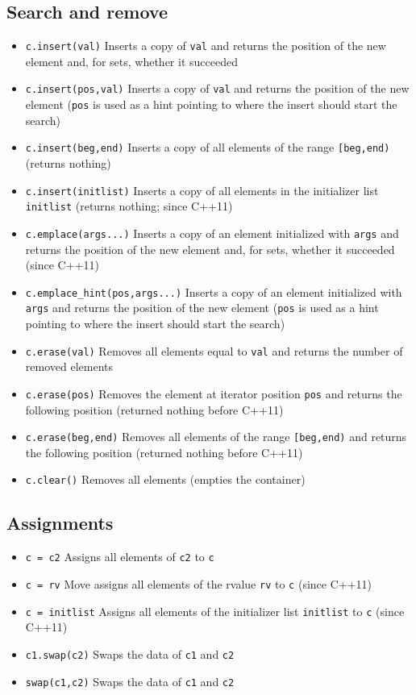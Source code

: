 \documentclass{report}
\begin{document}
\subsection{Search and remove}
\begin{itemize}
    \item \texttt{c.insert(val)} Inserts a copy of \texttt{val} and returns the position of the new element and, for sets, whether it succeeded
    \item \texttt{c.insert(pos,val)} Inserts a copy of \texttt{val} and returns the position of the new element (\texttt{pos} is used as a hint pointing to where the insert should start the search)
    \item \texttt{c.insert(beg,end)} Inserts a copy of all elements of the range \texttt{[beg,end)} (returns nothing)
    \item \texttt{c.insert(initlist)} Inserts a copy of all elements in the initializer list \texttt{initlist} (returns nothing; since C++11)
    \item \texttt{c.emplace(args...)} Inserts a copy of an element initialized with \texttt{args} and returns the position of the new element and, for sets, whether it succeeded (since C++11)
    \item \texttt{c.emplace\_hint(pos,args...)} Inserts a copy of an element initialized with \texttt{args} and returns the position of the new element (\texttt{pos} is used as a hint pointing to where the insert should start the search)
    \item \texttt{c.erase(val)} Removes all elements equal to \texttt{val} and returns the number of removed elements
    \item \texttt{c.erase(pos)} Removes the element at iterator position \texttt{pos} and returns the following position (returned nothing before C++11)
    \item \texttt{c.erase(beg,end)} Removes all elements of the range \texttt{[beg,end)} and returns the following position (returned nothing before C++11)
    \item \texttt{c.clear()} Removes all elements (empties the container)
\end{itemize}

\pagebreak 
{}
\subsection{Assignments}
\begin{itemize}
    \item \texttt{c = c2} Assigns all elements of \texttt{c2} to \texttt{c}
    \item \texttt{c = rv} Move assigns all elements of the rvalue \texttt{rv} to \texttt{c} (since C++11)
    \item \texttt{c = initlist} Assigns all elements of the initializer list \texttt{initlist} to \texttt{c} (since C++11)
    \item \texttt{c1.swap(c2)} Swaps the data of \texttt{c1} and \texttt{c2}
    \item \texttt{swap(c1,c2)} Swaps the data of \texttt{c1} and \texttt{c2}
\end{itemize}
\end{document}
